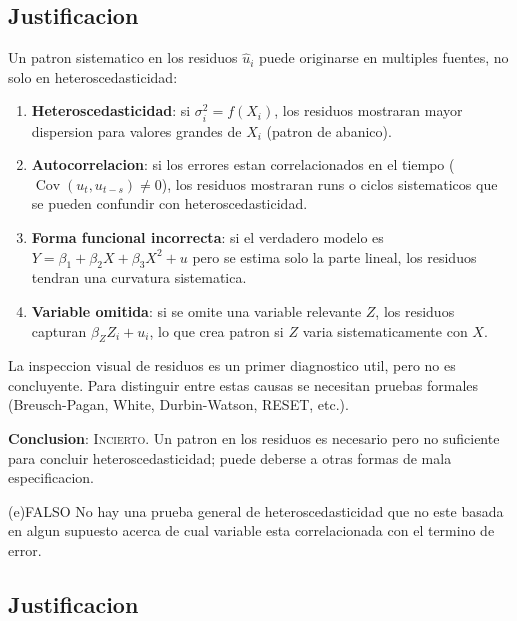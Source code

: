 \documentclass[12pt, letterpaper]{article}
\theoremstyle{remark}
\newcommand{\Cov}{\operatorname{Cov}}
\begin{document}
\subsection*{Justificacion}

Un patron sistematico en los residuos $\hat u_i$ puede originarse en multiples
fuentes, no solo en heteroscedasticidad:

\begin{enumerate}[leftmargin=1.8em, itemsep=5pt]
  \item \textbf{Heteroscedasticidad}: si $\sigma_i^2 = f(X_i)$, los residuos
    mostraran mayor dispersion para valores grandes de $X_i$ (patron de abanico).

  \item \textbf{Autocorrelacion}: si los errores estan correlacionados en el
    tiempo ($\Cov(u_t, u_{t-s}) \neq 0$), los residuos mostraran runs o ciclos
    sistematicos que se pueden confundir con heteroscedasticidad.

  \item \textbf{Forma funcional incorrecta}: si el verdadero modelo es
    $Y = \beta_1 + \beta_2 X + \beta_3 X^2 + u$ pero se estima solo la parte
    lineal, los residuos tendran una curvatura sistematica.

  \item \textbf{Variable omitida}: si se omite una variable relevante $Z$,
    los residuos capturan $\beta_Z Z_i + u_i$, lo que crea patron si $Z$ varia
    sistematicamente con $X$.
\end{enumerate}

La inspeccion visual de residuos es un primer diagnostico util, pero no
es concluyente. Para distinguir entre estas causas se necesitan pruebas
formales (Breusch-Pagan, White, Durbin-Watson, RESET, etc.).

\textbf{Conclusion}: \textsc{Incierto}. Un patron en los residuos es necesario
pero no suficiente para concluir heteroscedasticidad; puede deberse a otras
formas de mala especificacion.

\bigskip

\begin{verdict}{(e)}{FALSO}
  No hay una prueba general de heteroscedasticidad que no este basada en algun
  supuesto acerca de cual variable esta correlacionada con el termino de error.
\end{verdict}

\subsection*{Justificacion}
\end{document}
